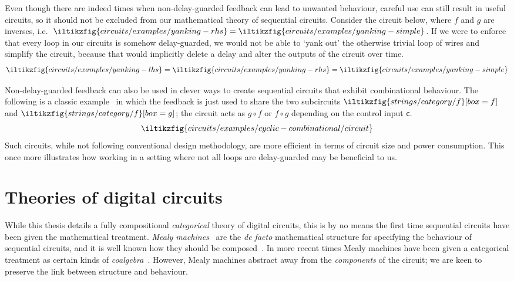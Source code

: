 Even though there are indeed times when non-delay-guarded feedback can lead to
unwanted behaviour, careful use can still result in useful circuits, so it
should not be excluded from our mathematical theory of sequential circuits.
Consider the circuit below, where \(f\) and \(g\) are inverses, i.e.\
\(
\iltikzfig{circuits/examples/yanking-rhs}
=
\iltikzfig{circuits/examples/yanking-simple}
\).
If we were to enforce that every loop in our circuits is
somehow delay-guarded, we would not be able to `yank out' the otherwise trivial
loop of wires and simplify the circuit, because that would implicitly delete a
delay and alter the outputs of the circuit over time.
\[
    \iltikzfig{circuits/examples/yanking-lhs}
    =
    \iltikzfig{circuits/examples/yanking-rhs}
    =
    \iltikzfig{circuits/examples/yanking-simple}
\]

Non-delay-guarded feedback can also be used in clever ways to create sequential
circuits that exhibit combinational behaviour.
The following is a classic example~\cite{malik1994analysis} in which the
feedback is just used to share the two subcircuits \(
\iltikzfig{strings/category/f}[box=f]
\) and \(
\iltikzfig{strings/category/f}[box=g]
\); the circuit acts as \(g \circ f\) or
\(f \circ g\) depending on the control input \(\mathsf{c}\).
\[
    \iltikzfig{circuits/examples/cyclic-combinational/circuit}
\]
Such circuits, while not following conventional design methodology, are more
efficient in terms of circuit size and power consumption.
This once more illustrates how working in a setting where not all loops are
delay-guarded may be beneficial to us.

\section{Theories of digital circuits}

While this thesis details a fully compositional
\emph{categorical} theory of digital circuits, this is by no means the first
time sequential circuits have been given the mathematical treatment.
\emph{Mealy machines}~\cite{mealy1955method} are the \emph{de facto}
mathematical structure for specifying the behaviour of sequential circuits, and
it is well
known how they should be composed~\cite{ginzburg2014algebraic}.
In more recent times Mealy machines have been given a categorical treatment as
certain kinds of \emph{coalgebra}~\cite{rutten2006algebraic,bonsangue2008coalgebraic}.
However, Mealy machines abstract away from the \emph{components} of the circuit;
we are keen to preserve the link between structure and behaviour.


